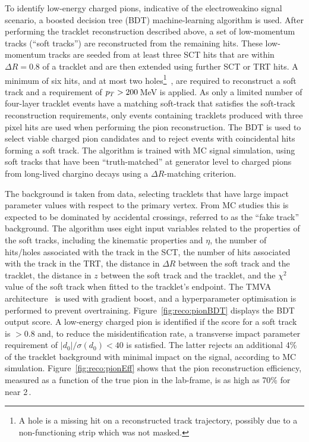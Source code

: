 To identify low-energy charged pions, indicative of the electroweakino signal scenario, a boosted decision tree (BDT) machine-learning algorithm is used. After performing the tracklet reconstruction described above, a set of low-momentum tracks (\enquote{soft tracks}) are reconstructed from the remaining hits. These low-momentum tracks are seeded from at least three SCT hits that are within $\Delta R = 0.8$ of a tracklet and are then extended using further SCT or TRT hits. A minimum of six hits, and at most two holes\footnote{A hole is a missing hit on a reconstructed track trajectory, possibly due to a non-functioning strip which was not masked.}~\cite{ATL-PHYS-PUB-2019-011}, are required to reconstruct a soft track and a requirement of $p_T > 200$\,MeV is applied. As only a limited number of four-layer tracklet events have a matching soft-track that satisfies the soft-track reconstruction requirements, only events containing tracklets produced with three pixel hits are used when performing the pion reconstruction. The BDT is used to select viable charged pion candidates and to reject events with coincidental hits forming a soft track. The algorithm is trained with MC signal simulation, using soft tracks that have been \enquote{truth-matched} at generator level to charged pions from long-lived chargino decays using a $\Delta R$-matching criterion.

The background is taken from data, selecting tracklets that have large impact parameter values with respect to the primary vertex. From MC studies this is expected to be dominated by accidental crossings, referred to as the \enquote{fake track} background. The algorithm uses eight input variables related to the properties of the soft tracks, including the kinematic properties \pt and $\eta$, the number of hits/holes associated with the track in the SCT, the number of hits associated with the track in the TRT, the distance in $\Delta R$ between the soft track and the tracklet, the distance in $z$ between the soft track and the tracklet, and the $\chi^2$ value of the soft track when fitted to the tracklet's endpoint. The TMVA architecture~\cite{TMVA} is used with gradient boost, and a hyperparameter optimisation is performed to prevent overtraining. Figure~\ref{fig:reco:pionBDT} displays the BDT output score. A low-energy charged pion is identified if the score for a soft track is ${>}0.8$ and, to reduce the misidentification rate, a transverse impact parameter requirement of $|d_0|/\sigma(d_0) < 40$ is satisfied. The latter rejects an additional 4\% of the tracklet background with minimal impact on the signal, according to MC simulation. Figure~\ref{fig:reco:pionEff} shows that the pion reconstruction efficiency, measured as a function of the true pion \pt in the lab-frame, is as high as 70\% for \pt near 2\,\GeV.

